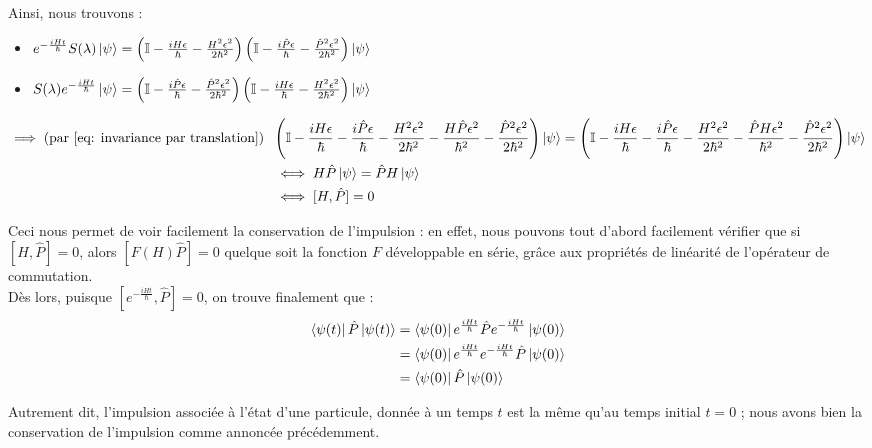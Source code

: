 \documentclass{article}
\begin{document}
Ainsi, nous trouvons : 
\begin{itemize}[label = \textbullet]
    \item $ e^{-\frac{iHt}{\hbar}} S(\lambda) \ket{\psi} = \left( \mathbb{I} - \frac{iH\epsilon}{\hbar} - \frac{H^2 \epsilon^2}{2\hbar^2} \right) \left( \mathbb{I} - \frac{i\hat{P}\epsilon}{\hbar} - \frac{\hat{P}^2\epsilon^2}{2\hbar^2} \right) \ket{\psi}$ 
    \item $ S(\lambda) e^{-\frac{iHt}{\hbar}} \ket{\psi} = \left( \mathbb{I} - \frac{i\hat{P}\epsilon}{\hbar} - \frac{\hat{P}^2\epsilon^2}{2\hbar^2} \right)\left( \mathbb{I} - \frac{iH\epsilon}{\hbar} - \frac{H^2 \epsilon^2}{2\hbar^2} \right) \ket{\psi} $
\end{itemize}
    
\begin{align}
\implies \mbox{(par \eqref{eq: invariance par translation}) } \; &\left( \mathbb{I} - \frac{iH\epsilon}{\hbar} - \frac{i\hat{P}\epsilon}{\hbar} - \frac{H^2\epsilon^2}{2\hbar^2} - \frac{H \hat{P}\epsilon^2}{\hbar^2}- \frac{\hat{P}^2 \epsilon^2}{2\hbar^2} \right) \ket{\psi} = \left( \mathbb{I} - \frac{iH\epsilon}{\hbar} - \frac{i\hat{P}\epsilon}{\hbar} - \frac{H^2\epsilon^2}{2\hbar^2} - \frac{\hat{P} H\epsilon^2}{\hbar^2}- \frac{\hat{P}^2 \epsilon^2}{2\hbar^2} \right) \ket{\psi} \notag\\
&\iff H\hat{P} \ket{\psi} = \hat{P} H \ket{\psi} \notag \\
&\iff [H, \hat{P}] = 0 \label{eq: commutateur invariance par translation}
\end{align} 

Ceci nous permet de voir facilement la conservation de l'impulsion : en effet, nous pouvons tout d'abord facilement vérifier que si $[H, \hat{P}] = 0$, alors $[F(H)\hat{P}] = 0$ quelque soit la fonction $F$ développable en série, grâce aux propriétés de linéarité de l'opérateur de commutation. \\
Dès lors, puisque $[e^{-\frac{iHt}{\hbar}}, \hat{P}] = 0$, on trouve finalement que : 
\begin{align}
    \bra{\psi (t)} \hat{P} \ket{\psi (t)} &= \bra{\psi(0)} e^{\frac{iHt}{\hbar}} \hat{P} e^{-\frac{iHt}{\hbar}} \ket{\psi (0)} \notag \\
    & = \bra{\psi (0)} e^{\frac{iHt}{\hbar}}e^{-\frac{iHt}{\hbar}} \hat{P} \ket{\psi (0)} \notag \\
    &= \bra{\psi(0)} \hat{P} \ket{\psi (0)}
\end{align}

Autrement dit, l'impulsion associée à l'état d'une particule, donnée à un temps $t$ est la même qu'au temps initial $t=0$ ; nous avons bien la conservation de l'impulsion comme annoncée précédemment. \\
\end{document}
